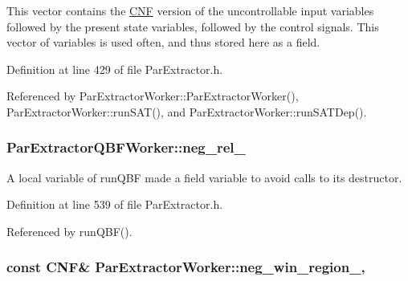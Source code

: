 This vector contains the \hyperlink{classCNF}{C\-N\-F} version of the uncontrollable input variables followed by the present state variables, followed by the control signals. This vector of variables is used often, and thus stored here as a field. 

Definition at line 429 of file Par\-Extractor.\-h.



Referenced by Par\-Extractor\-Worker\-::\-Par\-Extractor\-Worker(), Par\-Extractor\-Worker\-::run\-S\-A\-T(), and Par\-Extractor\-Worker\-::run\-S\-A\-T\-Dep().

\hypertarget{classParExtractorQBFWorker_a02c79f381699aa1a1ee4c587de800519}{
\subsubsection[{neg\-\_\-rel\-\_\-}]{ Par\-Extractor\-Q\-B\-F\-Worker\-::neg\-\_\-rel\-\_\-\hspace{0.3cm}{\ttfamily [protected]}}}\label{classParExtractorQBFWorker_a02c79f381699aa1a1ee4c587de800519}


A local variable of run\-Q\-B\-F made a field variable to avoid calls to its destructor. 



Definition at line 539 of file Par\-Extractor.\-h.



Referenced by run\-Q\-B\-F().

\hypertarget{classParExtractorWorker_a423caaf7f20528eb06b176acc09ae8ee}{
\subsubsection[{neg\-\_\-win\-\_\-region\-\_\-}]{\setlength{\rightskip}{0pt plus 5cm}const {\bf C\-N\-F}\& Par\-Extractor\-Worker\-::neg\-\_\-win\-\_\-region\-\_\-\hspace{0.3cm}{\ttfamily [protected]}, {\ttfamily [inherited]}}}\label{classParExtractorWorker_a423caaf7f20528eb06b176acc09ae8ee}


